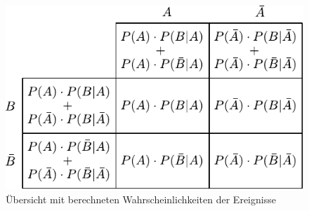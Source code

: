 \begin{figure}
        \centering
        \includegraphics[scale=\graphscale]{bedingte-wahrscheinlichkeit-detail.pdf}
        \caption{Übersicht mit berechneten Wahrscheinlichkeiten der Ereignisse}
\end{figure}

